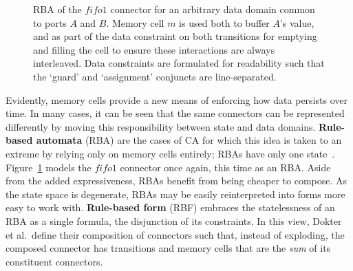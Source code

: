 \begin{figure}[ht]
	\centering
	\caption[RBA for fifo1 connector.]{RBA of the $fifo1$ connector for an arbitrary data domain common to ports $A$ and $B$. Memory cell $m$ is used both to buffer $A$'s value, and as part of the data constraint on both transitions for emptying and filling the cell to ensure these interactions are always interleaved. Data constraints are formulated for readability such that the `guard' and `assignment' conjuncts are line-separated.}
	\label{fig:fifo1_rba}
\end{figure}
Evidently, memory cells provide a new means of enforcing how data persists over time. In many cases, it can be seen that the same connectors can be represented differently by moving this responsibility between state and data domains. \textbf{Rule-based automata} (RBA) are the cases of CA for which this idea is taken to an extreme by relying only on memory cells entirely; RBAs have only one state~\cite{dokter2018rule}. Figure~\ref{fig:fifo1_rba} models the $fifo1$ connector once again, this time as an RBA. Aside from the added expressiveness, RBAs benefit from being cheaper to compose. As the state space is degenerate, RBAs may be easily reinterpreted into forms more easy to work with. \textbf{Rule-based form} (RBF) embraces the statelessness of an RBA as a single formula, the disjunction of its constraints. In this view, Dokter et al.\ define their composition of connectors such that, instead of exploding, the composed connector has transitions and memory cells that are the \textit{sum} of its constituent connectors.



